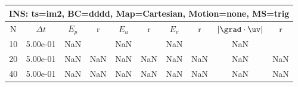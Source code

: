
\begin{tabular}{|c|c|c|c|c|c|c|c|c|c|} \hline
 \multicolumn{10}{|c|}{INS: ts=im2, BC=dddd, Map=Cartesian, Motion=none, MS=trig } \\ \hline 
     N  &   $\Delta t$ & $E_p$   &  r  &   $E_u$   &   r    &   $E_v$   & r   &  $|\grad\cdot\uv|$  & r   \\ \hline 
  10   &  5.00e-01  &        NaN  &        &        NaN  &        &        NaN  &        &        NaN  &        \\ 
  20   &  5.00e-01  &        NaN  & NaN  &        NaN  & NaN  &        NaN  & NaN  &        NaN  & NaN  \\ 
  40   &  5.00e-01  &        NaN  & NaN  &        NaN  & NaN  &        NaN  & NaN  &        NaN  & NaN  \\ 
 \hline 
\end{tabular}

